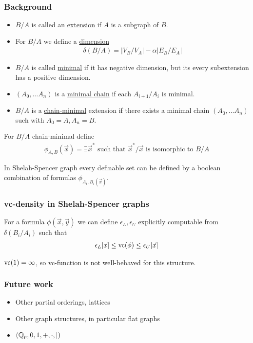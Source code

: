 \documentclass{beamer}
\newcommand{\defn}{\underline}
\begin{document}
\begin{frame}
  \frametitle{Background}
  \begin{itemize}
  \item $B/A$ is called an \defn{extension} if $A$ is a subgraph of $B$.
  \item For $B/A$ we define a \defn{dimension}
    \begin{align*}
      \delta(B/A) = |V_B/V_A| - \alpha |E_B/E_A|
    \end{align*}
  \item $B/A$ is called \defn{minimal} if it has negative dimension, but its every subextension has a positive dimension.
  \item $(A_0, \ldots A_n)$ is a \defn{minimal chain} if each $A_{i + 1}/A_i$ is minimal.
  \item $B/A$ is a \defn{chain-minimal} extension if there exists a minimal chain $(A_0, \ldots A_n)$ such with $A_0 = A, A_n = B$.
  \end{itemize}
  For $B/A$ chain-minimal define
  \begin{align*}
    \phi_{A,B}(\vec x) = \exists \vec x^* \text { such that $\vec x^*/\vec x$ is isomorphic to $B/A$}
  \end{align*}
  \begin{Theorem} 
    In Shelah-Spencer graph every definable set can be defined by a boolean combination of formulas $\phi_{A_i, B_i(\vec x)}$.
  \end{Theorem}
\end{frame}

\begin{frame}
  \frametitle{vc-density in Shelah-Spencer graphs}
  \begin{Theorem} [B. '15]
    For a formula $\phi(\vec x, \vec y)$ we can define $\epsilon_L, \epsilon_U$ explicitly computable from $\delta(B_i/A_i)$ such that
    \begin{align*}
      \epsilon_L |\vec x| \leq \operatorname{vc}(\phi) \leq \epsilon_U |\vec x|
    \end{align*}
  \end{Theorem}
  \begin{Corollary}
    $\operatorname{vc}(1) = \infty$, so vc-function is not well-behaved for this structure.
  \end{Corollary}
\end{frame}

\begin{frame}
  \frametitle{Future work}
  \begin{itemize}
    \item Other partial orderings, lattices
    \item Other graph structures, in particular flat graphs
    \item $(\mathbb{Q}_p, 0, 1, +, \cdot, \mid)$
  \end{itemize}
\end{frame}
\end{document}

